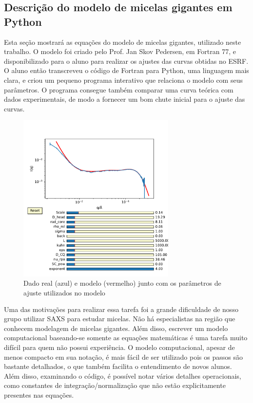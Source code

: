 \begin{apendicesenv}
\section{Descrição do modelo de micelas gigantes em Python}

	Esta seção mostrará as equações do modelo de micelas gigantes, utilizado neste trabalho. O modelo foi criado pelo Prof. Jan Skov Pedersen, em Fortran 77, e disponibilizado para o aluno para realizar os ajustes das curvas obtidas no ESRF. O aluno então transcreveu o código de Fortran para Python, uma linguagem mais clara, e criou um pequeno programa interativo que relaciona o modelo com seus parâmetros. O programa consegue também comparar uma curva teórica com dados experimentais, de modo a fornecer um bom chute inicial para o ajuste das curvas.
	
\begin{figure}[H]
	\centering
	\includegraphics[width=0.7\textwidth]{imagens/saxs/Modelo_dado_SAXS_python}
	\caption{Dado real (azul) e modelo (vermelho) junto com os parâmetros de ajuste utilizados no modelo}
	\label{fig:saxs_modelo_dado_saxs_python}
\end{figure}

	Uma das motivações para realizar essa tarefa foi a grande dificuldade de nosso grupo utilizar SAXS para estudar micelas. Não há especialistas na região que conhecem modelagem de micelas gigantes. Além disso, escrever um modelo computacional baseando-se somente as equações matemáticas é uma tarefa muito difícil para quem não possui experiência. O modelo computacional, apesar de menos compacto em sua notação, é mais fácil de ser utilizado pois os passos são bastante detalhados, o que também facilita o entendimento de novos alunos. Além disso, examinando o código, é possível notar vários detalhes operacionais, como constantes de integração/normalização que não estão explicitamente presentes nas equações.
	

\end{apendicesenv}
